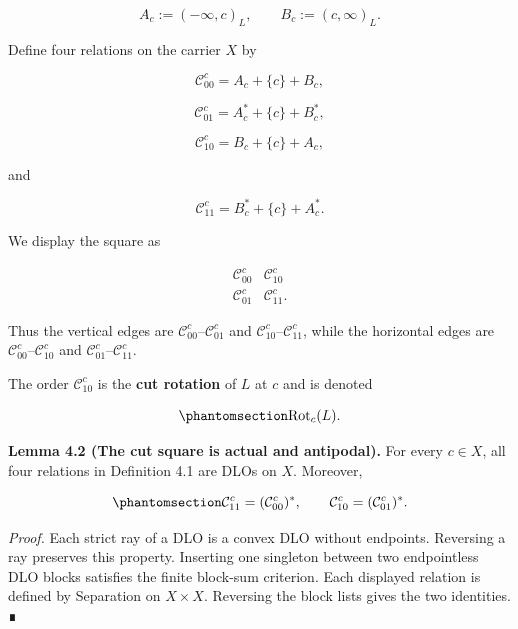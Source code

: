 \documentclass[
  english,
  11pt,
  reqno]{amsart}
\begin{document}
\[
A_c:=(-\infty,c)_L,
\qquad
B_c:=(c,\infty)_L.
\]

Define four relations on the carrier \(X\) by

\[
\mathcal C_{00}^c
=
A_c+\{c\}+B_c,
\]

\[
\mathcal C_{01}^c
=
A_c^*+\{c\}+B_c^*,
\]

\[
\mathcal C_{10}^c
=
B_c+\{c\}+A_c,
\]

and

\[
\mathcal C_{11}^c
=
B_c^*+\{c\}+A_c^*.
\]

We display the square as

\[
\begin{matrix}
\mathcal C_{00}^c & \mathcal C_{10}^c\\
\mathcal C_{01}^c & \mathcal C_{11}^c.
\end{matrix}
\]

Thus the vertical edges are \(\mathcal C_{00}^c\)--\(\mathcal C_{01}^c\)
and \(\mathcal C_{10}^c\)--\(\mathcal C_{11}^c\), while the horizontal
edges are \(\mathcal C_{00}^c\)--\(\mathcal C_{10}^c\) and
\(\mathcal C_{01}^c\)--\(\mathcal C_{11}^c\).

The order \(\mathcal C_{10}^c\) is the \textbf{cut rotation} of \(L\) at
\(c\) and is denoted

\begin{equation}\protect\phantomsection\label{eq:cut-rotation}{
\operatorname{Rot}_c(L).
}\end{equation}

\protect{}\label{lem:4-2-cut-square-actual}

\textbf{Lemma 4.2 (The cut square is actual and antipodal).} For every
\(c\in X\), all four relations in Definition 4.1 are DLOs on \(X\).
Moreover,

\begin{equation}\protect\phantomsection\label{eq:cut-square-antipodal}{
\mathcal C_{11}^c
=
(\mathcal C_{00}^c)^*,
\qquad
\mathcal C_{10}^c
=
(\mathcal C_{01}^c)^*.
}\end{equation}

\emph{Proof.} Each strict ray of a DLO is a convex DLO without
endpoints. Reversing a ray preserves this property. Inserting one
singleton between two endpointless DLO blocks satisfies the finite
block-sum criterion. Each displayed relation is defined by Separation on
\(X\times X\). Reversing the block lists gives the two identities. ∎

\protect{}\label{lem:4-3-antipodal-coloring}
\end{document}
